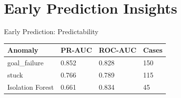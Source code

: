 \documentclass[aspectratio=169, 11pt]{beamer}
\newcommand{\fullsectiontitle}{}
\newcommand{\presentationsection}[2][]{%
  \gdef\fullsectiontitle{#2}%
  \section[#1]{#2}%
}
\begin{document}
\presentationsection[Early Prediction Insights]{Early Prediction Insights}

\begin{frame}{Early Prediction: Predictability}
  \begin{table}
    \small
    \renewcommand{\arraystretch}{1.3}
    \begin{tabular}{@{}L{3.5cm} C{2.0cm} C{2.0cm} C{1.5cm}@{}}
      \toprule
      \textbf{Anomaly} & \textbf{PR-AUC} & \textbf{ROC-AUC} & \textbf{Cases} \\
      \midrule
      goal\_failure & 0.852 & 0.828 & 150 \\
      stuck & 0.766 & 0.789 & 115 \\
      Isolation Forest & 0.661 & 0.834 & 45 \\
      \bottomrule
    \end{tabular}
  \end{table}
\end{frame}
\end{document}
